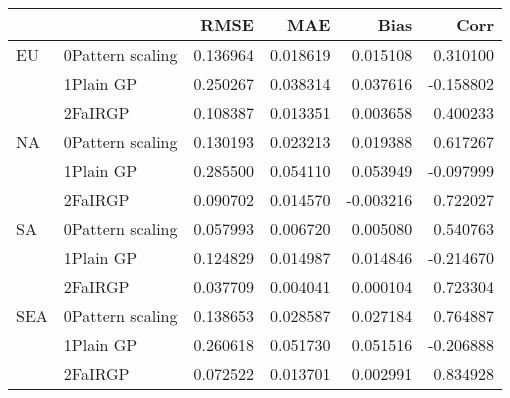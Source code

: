 \begin{tabular}{llrrrr}
\toprule
    &         &      RMSE &       MAE &      Bias &      Corr \\
\midrule
EU & 0Pattern scaling &  0.136964 &  0.018619 &  0.015108 &  0.310100 \\
    & 1Plain GP &  0.250267 &  0.038314 &  0.037616 & -0.158802 \\
    & 2FaIRGP &  0.108387 &  0.013351 &  0.003658 &  0.400233 \\
NA & 0Pattern scaling &  0.130193 &  0.023213 &  0.019388 &  0.617267 \\
    & 1Plain GP &  0.285500 &  0.054110 &  0.053949 & -0.097999 \\
    & 2FaIRGP &  0.090702 &  0.014570 & -0.003216 &  0.722027 \\
SA & 0Pattern scaling &  0.057993 &  0.006720 &  0.005080 &  0.540763 \\
    & 1Plain GP &  0.124829 &  0.014987 &  0.014846 & -0.214670 \\
    & 2FaIRGP &  0.037709 &  0.004041 &  0.000104 &  0.723304 \\
SEA & 0Pattern scaling &  0.138653 &  0.028587 &  0.027184 &  0.764887 \\
    & 1Plain GP &  0.260618 &  0.051730 &  0.051516 & -0.206888 \\
    & 2FaIRGP &  0.072522 &  0.013701 &  0.002991 &  0.834928 \\
\bottomrule
\end{tabular}
